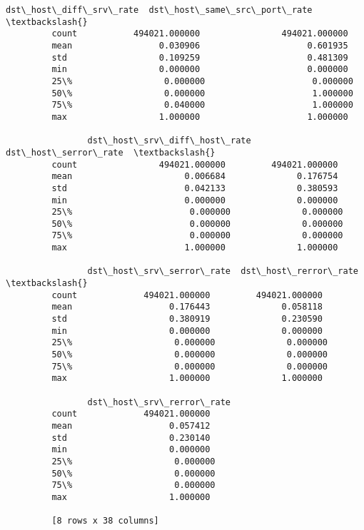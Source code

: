 \documentclass[11pt]{article}
\begin{document}
\begin{Verbatim}[commandchars=\\\{\}]
                dst\_host\_diff\_srv\_rate  dst\_host\_same\_src\_port\_rate  \textbackslash{}
         count           494021.000000                494021.000000   
         mean                 0.030906                     0.601935   
         std                  0.109259                     0.481309   
         min                  0.000000                     0.000000   
         25\%                  0.000000                     0.000000   
         50\%                  0.000000                     1.000000   
         75\%                  0.040000                     1.000000   
         max                  1.000000                     1.000000   
         
                dst\_host\_srv\_diff\_host\_rate  dst\_host\_serror\_rate  \textbackslash{}
         count                494021.000000         494021.000000   
         mean                      0.006684              0.176754   
         std                       0.042133              0.380593   
         min                       0.000000              0.000000   
         25\%                       0.000000              0.000000   
         50\%                       0.000000              0.000000   
         75\%                       0.000000              0.000000   
         max                       1.000000              1.000000   
         
                dst\_host\_srv\_serror\_rate  dst\_host\_rerror\_rate  \textbackslash{}
         count             494021.000000         494021.000000   
         mean                   0.176443              0.058118   
         std                    0.380919              0.230590   
         min                    0.000000              0.000000   
         25\%                    0.000000              0.000000   
         50\%                    0.000000              0.000000   
         75\%                    0.000000              0.000000   
         max                    1.000000              1.000000   
         
                dst\_host\_srv\_rerror\_rate  
         count             494021.000000  
         mean                   0.057412  
         std                    0.230140  
         min                    0.000000  
         25\%                    0.000000  
         50\%                    0.000000  
         75\%                    0.000000  
         max                    1.000000  
         
         [8 rows x 38 columns]
\end{Verbatim}
            
\end{document}
